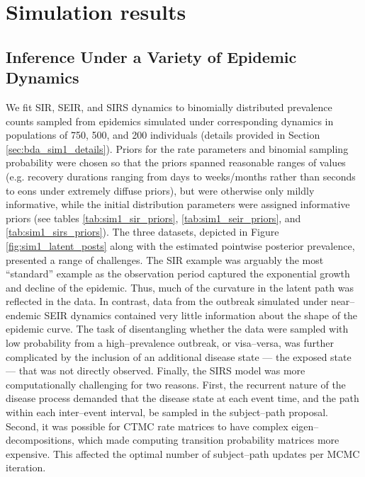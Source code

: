 \section{Simulation results}
\label{sec:bda_simulations}

\subsection{Inference Under a Variety of Epidemic Dynamics}
\label{subsec:bda_sir_seir_sirs_sim}
We fit SIR, SEIR, and SIRS dynamics to binomially distributed prevalence counts sampled from epidemics simulated under corresponding dynamics in populations of 750, 500, and 200 individuals (details provided in Section \ref{sec:bda_sim1_details}). Priors for the rate parameters and binomial sampling probability were chosen so that the priors spanned reasonable ranges of values (e.g. recovery durations ranging from days to weeks/months rather than seconds to eons under extremely diffuse priors), but were otherwise only mildly informative, while the initial distribution parameters were assigned informative priors (see tables \ref{tab:sim1_sir_priors}, \ref{tab:sim1_seir_priors}, and \ref{tab:sim1_sirs_priors}). The three datasets, depicted in Figure \ref{fig:sim1_latent_posts} along with the estimated pointwise posterior prevalence, presented a range of challenges. The SIR example was arguably the most ``standard'' example as the observation period captured the exponential growth and decline of the epidemic. Thus, much of the curvature in the latent path was reflected in the data. In contrast, data from the outbreak simulated under near--endemic SEIR dynamics contained very little information about the shape of the epidemic curve. The task of disentangling whether the data were sampled with low probability from a high--prevalence outbreak, or visa--versa, was further complicated by the inclusion of an additional disease state --- the exposed state --- that was not directly observed. Finally, the SIRS model was more computationally challenging for two reasons. First, the recurrent nature of the disease process demanded that the disease state at each event time, and the path within each inter--event interval, be sampled in the subject--path proposal. Second, it was possible for CTMC rate matrices to have complex eigen--decompositions, which made computing transition probability matrices more expensive. This affected the optimal number of subject--path updates per MCMC iteration.

